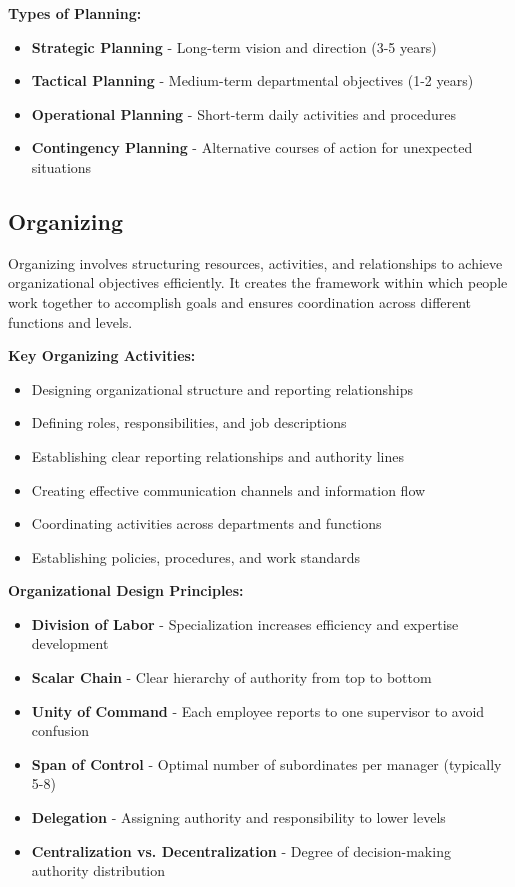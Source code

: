 \documentclass[12pt]{article}
\begin{document}
\textbf{Types of Planning:}
\begin{itemize}
    \item \textbf{Strategic Planning} - Long-term vision and direction (3-5 years)
    \item \textbf{Tactical Planning} - Medium-term departmental objectives (1-2 years)
    \item \textbf{Operational Planning} - Short-term daily activities and procedures
    \item \textbf{Contingency Planning} - Alternative courses of action for unexpected situations
\end{itemize}

\subsection{Organizing}
Organizing involves structuring resources, activities, and relationships to achieve organizational objectives efficiently. It creates the framework within which people work together to accomplish goals and ensures coordination across different functions and levels.

\textbf{Key Organizing Activities:}
\begin{itemize}
    \item Designing organizational structure and reporting relationships
    \item Defining roles, responsibilities, and job descriptions
    \item Establishing clear reporting relationships and authority lines
    \item Creating effective communication channels and information flow
    \item Coordinating activities across departments and functions
    \item Establishing policies, procedures, and work standards
\end{itemize}

\textbf{Organizational Design Principles:}
\begin{itemize}
    \item \textbf{Division of Labor} - Specialization increases efficiency and expertise development
    \item \textbf{Scalar Chain} - Clear hierarchy of authority from top to bottom
    \item \textbf{Unity of Command} - Each employee reports to one supervisor to avoid confusion
    \item \textbf{Span of Control} - Optimal number of subordinates per manager (typically 5-8)
    \item \textbf{Delegation} - Assigning authority and responsibility to lower levels
    \item \textbf{Centralization vs. Decentralization} - Degree of decision-making authority distribution
\end{itemize}
\end{document}
